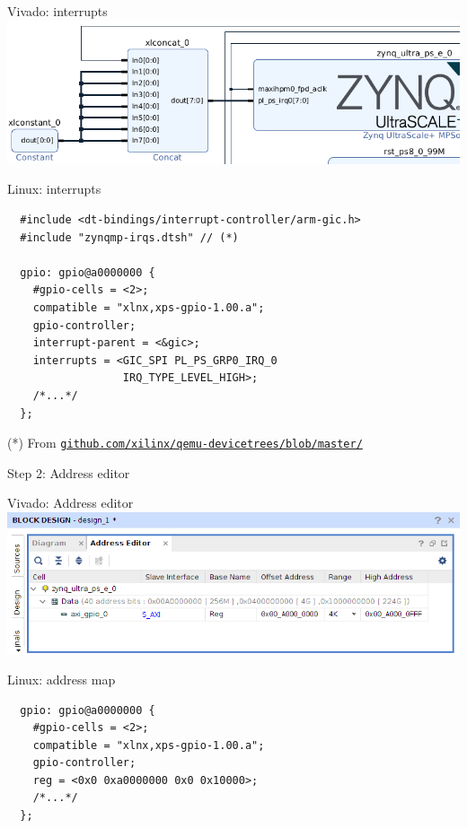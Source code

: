 \documentclass[xetex,table]{beamer}
\begin{document}
\begin{frame}[fragile]{Vivado: interrupts}
  \center\includegraphics[width=1.0\textwidth]{images/block-design-interrupt.png}
\end{frame}

\begin{frame}[fragile]{Linux: interrupts}
  \begin{verbatim}
  #include <dt-bindings/interrupt-controller/arm-gic.h>
  #include "zynqmp-irqs.dtsh" // (*)

  gpio: gpio@a0000000 {
    #gpio-cells = <2>;
    compatible = "xlnx,xps-gpio-1.00.a";
    gpio-controller;
    interrupt-parent = <&gic>;
    interrupts = <GIC_SPI PL_PS_GRP0_IRQ_0
                  IRQ_TYPE_LEVEL_HIGH>;
    /*...*/
  };
  \end{verbatim}

  \footnotesize (*) From
  \href{https://github.com/xilinx/qemu-devicetrees/blob/master/zynqmp-irqs.dtsh}{\tt github.com/xilinx/qemu-devicetrees/blob/master/}
\end{frame}

\begin{frame}[standout]
  Step 2: Address editor
\end{frame}

\begin{frame}{Vivado: Address editor}
  \center\includegraphics[width=1.0\textwidth]{images/address-editor.png}
\end{frame}

\begin{frame}[fragile]{Linux: address map}
  \begin{verbatim}
  gpio: gpio@a0000000 {
    #gpio-cells = <2>;
    compatible = "xlnx,xps-gpio-1.00.a";
    gpio-controller;
    reg = <0x0 0xa0000000 0x0 0x10000>;
    /*...*/
  };
  \end{verbatim}
\end{frame}
\end{document}
